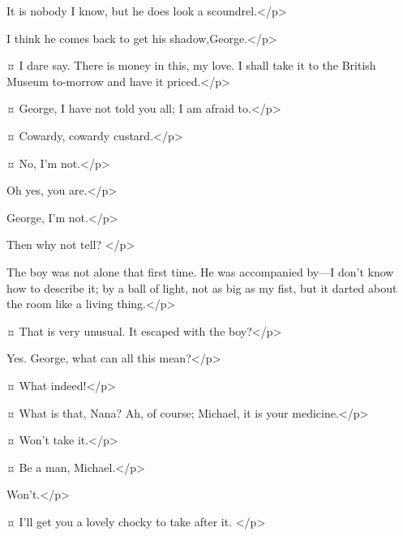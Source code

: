 \begin{drama}
\mrdarlingspeaks
It is nobody I know, but he does look a scoundrel.</p>

\mrsdarlingspeaks
I think he comes back to get his shadow,George.</p>

\mrdarlingspeaks {}¤
I dare say.
There is money in this, my love.
I shall take it to the British Museum to-morrow and have it priced.</p>


\mrsdarlingspeaks {}¤
George, I have not told you all; I am afraid to.</p>

\mrdarlingspeaks {}¤
Cowardy, cowardy custard.</p>

\mrsdarlingspeaks {}¤
No, I'm not.</p>

\mrdarlingspeaks
Oh yes, you are.</p>

\mrsdarlingspeaks
George, I'm not.</p>

\mrdarlingspeaks
Then why not tell?
</p>

\mrsdarlingspeaks
The boy was not alone that first time.
He was accompanied by—I don't know how to describe it; by a ball of light, not as big as my fist, but it darted about the room like a living thing.</p>

\mrdarlingspeaks {}¤
That is very unusual.
It escaped with the boy?</p>

\mrsdarlingspeaks
Yes.
George, what can all this mean?</p>

\mrdarlingspeaks {}¤
What indeed!</p>


\mrsdarlingspeaks {}¤
What is that, Nana?
Ah, of course; Michael, it is your medicine.</p>

\michaelspeaks {}¤
Won't take it.</p>

\mrdarlingspeaks {}¤
Be a man, Michael.</p>

\michaelspeaks
Won't.</p>

\mrsdarlingspeaks {}¤
I'll get you a lovely chocky to take after it.
</p>


\end{drama}
